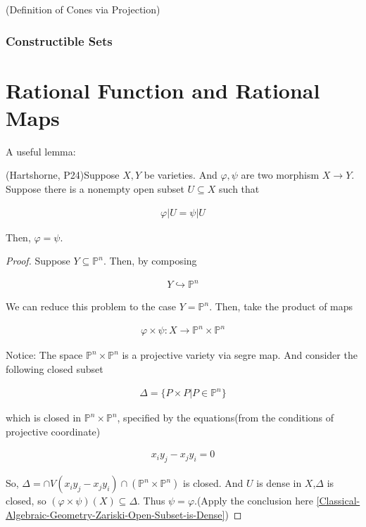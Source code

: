 \documentclass[Total.tex]{subfiles}
\begin{document}
		\begin{example}
			(Definition of Cones via Projection)
		\end{example}
		
		\subsubsection{Constructible Sets}
		
		
		
		
		\section{Rational Function and Rational Maps}
		
		A useful lemma:
		\begin{lemma}
			(Hartshorne, P24)Suppose $X,Y$ be varieties. And $\varphi,\psi$ are two morphism $X\rightarrow Y$. Suppose there is a nonempty open subset $U\subseteq X$ such that
			
			\begin{gather*}
				\varphi|U=\psi|U
			\end{gather*}
			
			Then, $\varphi=\psi$.
		\end{lemma}
		
		\begin{proof}
			Suppose $Y\subseteq\mathbb{P}^n$. Then, by composing 
			
			\begin{gather*}
				Y\hookrightarrow \mathbb{P}^n
			\end{gather*}
			
			We can reduce this problem to the case $Y=\mathbb{P}^n$. Then, take the product of maps
			
			\begin{gather*}
				\varphi\times \psi:X\rightarrow \mathbb{P}^n\times \mathbb{P}^n
			\end{gather*}
			
			Notice: The space $\mathbb{P}^n\times \mathbb{P}^n$ is a projective variety via segre map. And consider the following closed subset 
			
			\begin{gather*}
				\Delta=\{P\times P|P\in \mathbb{P}^n\}
			\end{gather*}
			
			which is closed in $\mathbb{P}^n\times \mathbb{P}^n$, specified by the equations(from the conditions of projective coordinate)
			
			\begin{gather*}
				x_iy_j-x_jy_i=0
			\end{gather*}
			
			So, $\Delta=\cap V(x_iy_j-x_jy_i)\cap (\mathbb{P}^n\times \mathbb{P}^n)$ is closed. And $U$ is dense in $X$,$\Delta$ is closed, so $(\varphi\times\psi)(X)\subseteq \Delta$. Thus $\psi=\varphi$.(Apply the conclusion here \ref{Classical-Algebraic-Geometry-Zariski-Open-Subset-is-Dense})
		\end{proof}
		
\end{document}
